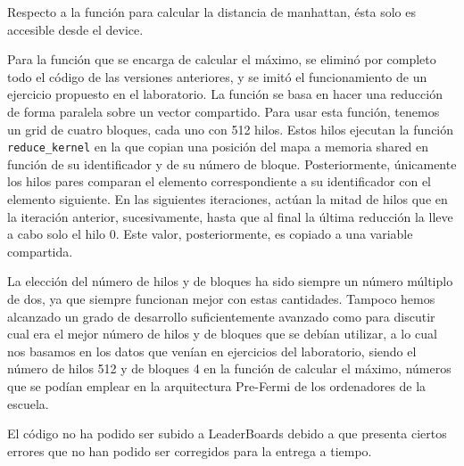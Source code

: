 \documentclass[8pt]{article}
\begin{document}
Respecto a la función para calcular la distancia de manhattan, ésta solo es accesible desde el device.

Para la función que se encarga de calcular el máximo, se eliminó por completo todo el código de las versiones anteriores, y se imitó el funcionamiento de un ejercicio propuesto en el laboratorio. La función se basa en hacer una reducción de forma paralela sobre un vector compartido. Para usar esta función, tenemos un grid de cuatro bloques, cada uno con 512 hilos. Estos hilos ejecutan la función  \texttt{reduce\_kernel} en la que copian una posición del mapa a memoria shared en función de su identificador y de su número de bloque. Posteriormente, únicamente los hilos pares comparan el elemento correspondiente a su identificador con el elemento siguiente. En las siguientes iteraciones, actúan la mitad de hilos que en la iteración anterior, sucesivamente, hasta que al final la última reducción la lleve a cabo solo el hilo 0. Este valor, posteriormente, es copiado a una variable compartida.

La elección del número de hilos y de bloques ha sido siempre un número múltiplo de dos, ya que siempre funcionan mejor con estas cantidades. Tampoco hemos alcanzado un grado de desarrollo suficientemente avanzado como para discutir cual era el mejor número de hilos y de bloques que se debían utilizar, a lo cual nos basamos en los datos que venían en ejercicios del  laboratorio, siendo el número de hilos 512 y de bloques 4 en la función de calcular el máximo, números que se podían emplear en la arquitectura Pre-Fermi de los ordenadores de la escuela. 

El código no ha podido ser subido a LeaderBoards debido a que presenta ciertos errores que no han podido ser corregidos para la entrega a tiempo.
\end{document}
